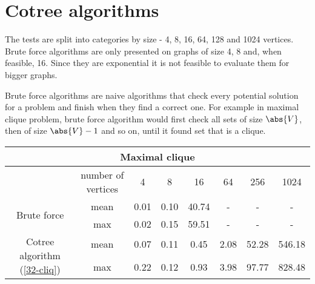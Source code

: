 \section{Cotree algorithms}

The tests are split into categories by size - 4, 8, 16, 64, 128 and 1024 vertices. Brute force algorithms are only presented on graphs of size 4, 8 and, when feasible, 16. Since they are exponential it is not feasible to evaluate them for bigger graphs.

Brute force algorithms are naive algorithms that check every potential solution for a problem and finish when they find a correct one. For example in maximal clique problem, brute force algorithm would first check all sets of size $\abs{V}$, then of size $\abs{V}-1$ and so on, until it found set that is a clique.

\begin{center}
    \begin{tabular}{|c|c|c|c|c|c|c|c|}
        \hline
        \multicolumn{8}{|c|}{Maximal clique}                                                                                 \\
        \hline
                                                          & number of vertices & 4    & 8    & 16    & 64   & 256   & 1024   \\
        \hline

        \multirow{2}{*}{Brute force}                      & mean               & 0.01 & 0.10 & 40.74 & -    & -     & -      \\
                                                          & max                & 0.02 & 0.15 & 59.51 & -    & -     & -      \\
        \hline
        \multirow{2}{*}{Cotree algorithm (\ref{32-cliq})} & mean               & 0.07 & 0.11 & 0.45  & 2.08 & 52.28 & 546.18 \\
                                                          & max                & 0.22 & 0.12 & 0.93  & 3.98 & 97.77 & 828.48 \\
        \hline
    \end{tabular}
\end{center}


